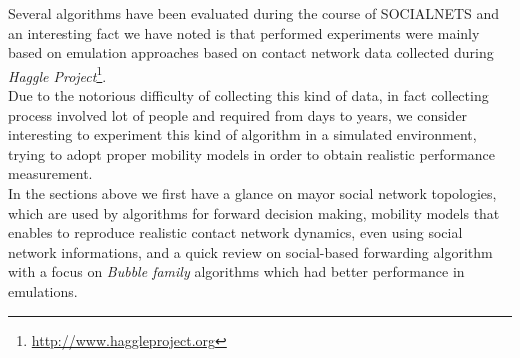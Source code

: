 Several algorithms have been evaluated during the course of SOCIALNETS and an interesting fact we have noted is that performed experiments were mainly based on emulation approaches\cite{bubble} based on contact network data collected during \emph{Haggle Project}\footnote{\url{http://www.haggleproject.org}}.\\
Due to the notorious difficulty of collecting this kind of data, in fact collecting process involved lot of people and required from days to years, we consider interesting to experiment this kind of algorithm in a simulated environment, trying to adopt proper mobility models in order to obtain realistic performance measurement.\\
In the sections above we first have a glance on mayor social network topologies\cite{social_networks}, which are used by algorithms for forward decision making, mobility models\cite{mobility_models} that enables to reproduce realistic contact network dynamics, even using social network informations, and a quick review on social-based forwarding algorithm\cite{routing} with a focus on \emph{Bubble family} algorithms\cite{bubble} which had better performance in emulations. \\ 


